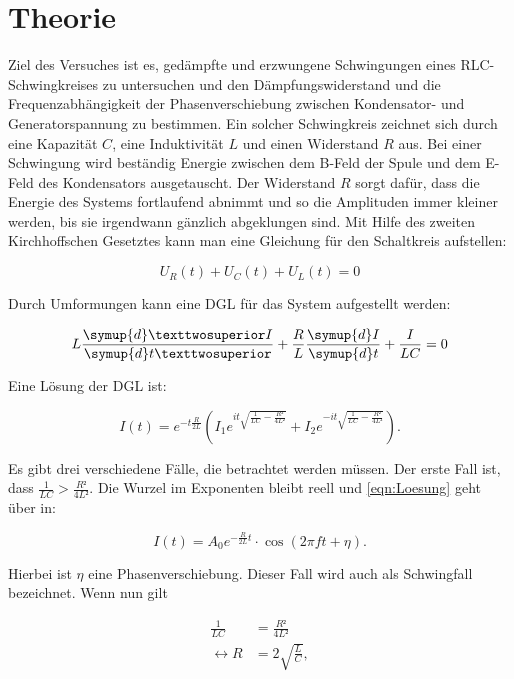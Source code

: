 \section{Theorie}
\label{sec:Theorie}

Ziel des Versuches ist es, gedämpfte und erzwungene Schwingungen eines
RLC-Schwingkreises zu untersuchen und den Dämpfungswiderstand und die 
Frequenzabhängigkeit der Phasenverschiebung zwischen Kondensator- und 
Generatorspannung zu bestimmen. 
Ein solcher Schwingkreis zeichnet sich durch eine Kapazität $C$, 
eine Induktivität $L$ und einen Widerstand $R$ aus. Bei einer 
Schwingung wird beständig Energie zwischen dem B-Feld der Spule und
dem E-Feld des Kondensators ausgetauscht. Der Widerstand $R$ sorgt
dafür, dass die Energie des Systems fortlaufend abnimmt und so die 
Amplituden immer kleiner werden, bis sie irgendwann gänzlich abgeklungen 
sind. 
Mit Hilfe des zweiten Kirchhoffschen Gesetztes kann man eine Gleichung 
für den Schaltkreis aufstellen: 

\begin{equation*}
U_R(t) + U_C(t) + U_L(t) = 0 
\end{equation*}

Durch Umformungen kann eine DGL für das System aufgestellt werden: 

\begin{equation}
L\frac{\symup{d}²I}{\symup{d}t²}+\frac{R}{L} \frac{\symup{d}I}{\symup{d}t}+\frac{I}{LC} = 0
\end{equation}

Eine Lösung der DGL ist: 

\begin{equation}
I(t) = e^{-t\frac{R}{2L}}\left(I_1 e^{it\sqrt{\frac{1}{LC}-\frac{R²}{4L²}}}+I_2 e^{-it\sqrt{\frac{1}{LC}-\frac{R²}{4L²}}} \right).
\label{eqn:Loesung}
\end{equation}

Es gibt drei verschiedene Fälle, die betrachtet werden müssen. 
Der erste Fall ist, dass $\frac{1}{LC} > \frac{R²}{4L²}$. Die Wurzel im Exponenten
bleibt reell und \eqref{eqn:Loesung} geht über in: 

\begin{equation*}
I(t) = A_0 e^{-\frac{R}{2L}t}\cdot \cos\left({2\pi ft+\eta}\right).
\end{equation*}

Hierbei ist $\eta$ eine Phasenverschiebung. Dieser Fall wird auch als 
Schwingfall bezeichnet. 
Wenn nun gilt

\begin{align*}
\frac{1}{LC} &= \frac{R²}{4L²}\\
\leftrightarrow R &= 2\sqrt{\frac{L}{C}},
\end{align*}

